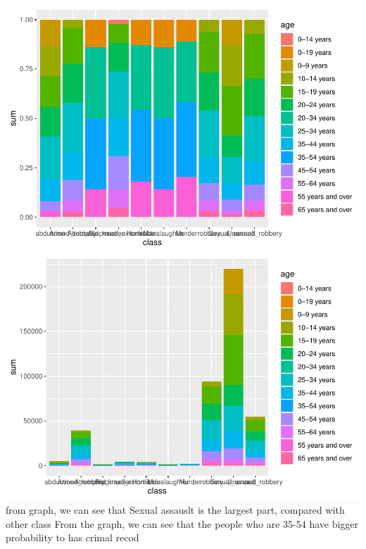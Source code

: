 \documentclass[11pt,a4paper,]{article}
\begin{document}
\includegraphics{report_files/figure-latex/graph-1.pdf} \includegraphics{report_files/figure-latex/graph-2.pdf}
from graph, we can see that Sexual assauslt is the largest part, compared with other class
From the graph, we can see that the people who are 35-54 have bigger probability to has crimal recod

\printbibliography
\end{document}
